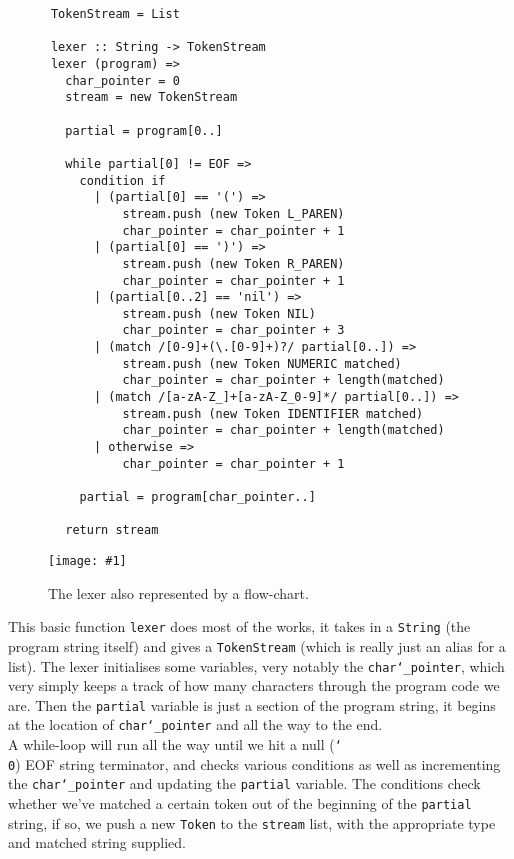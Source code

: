 \documentclass{article}
\newcommand{\code}[1]{\texttt{#1}}
\newcommand{\graph}[2]{
  \begin{figure}[H]
    \centering
    \texttt{[image: \#1]}
    \caption{#2}
  \end{figure}
}
\begin{document}
      \begin{verbatim}
      TokenStream = List

      lexer :: String -> TokenStream
      lexer (program) =>
        char_pointer = 0
        stream = new TokenStream

        partial = program[0..]

        while partial[0] != EOF =>
          condition if
            | (partial[0] == '(') =>
                stream.push (new Token L_PAREN)
                char_pointer = char_pointer + 1
            | (partial[0] == ')') =>
                stream.push (new Token R_PAREN)
                char_pointer = char_pointer + 1
            | (partial[0..2] == 'nil') =>
                stream.push (new Token NIL)
                char_pointer = char_pointer + 3
            | (match /[0-9]+(\.[0-9]+)?/ partial[0..]) =>
                stream.push (new Token NUMERIC matched)
                char_pointer = char_pointer + length(matched)
            | (match /[a-zA-Z_]+[a-zA-Z_0-9]*/ partial[0..]) =>
                stream.push (new Token IDENTIFIER matched)
                char_pointer = char_pointer + length(matched)
            | otherwise =>
                char_pointer = char_pointer + 1

          partial = program[char_pointer..]

        return stream
      \end{verbatim}

      \graph{lexer-flow}{The lexer also represented by a flow-chart.}

      This basic function \code{lexer} does most of the works, it takes in a
      \code{String} (the program string itself) and gives a \code{TokenStream}
      (which is really just an alias for a list). The lexer initialises some
      variables, very notably the \code{char\char`_pointer}, which very simply keeps
      a track of how many characters through the program code we are. Then the
      \code{partial} variable is just a section of the program string, it begins
      at the location of \code{char\char`_pointer} and all the way to the end.\\

      A while-loop will run all the way until we hit a null (\code{\char`\\0})
      EOF string terminator, and checks various conditions as well as incrementing
      the \code{char\char`_pointer} and updating the \code{partial} variable.
      The conditions check whether we've matched a certain token out of the beginning
      of the \code{partial} string, if so, we push a new \code{Token} to the
      \code{stream} list, with the appropriate type and matched string supplied.
\end{document}
